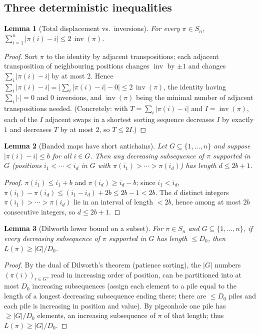 \documentclass[12pt]{article}
\newtheorem{lemma}{Lemma}
\theoremstyle{definition}
\DeclareMathOperator{\inv}{inv}
\begin{document}
\subsection{Three deterministic inequalities}
\begin{lemma}[Total displacement vs.\ inversions]\label{lem:tdisp}
For every $\pi\in S_n$, $\displaystyle\sum_{i=1}^n|\pi(i)-i|\le 2\,\inv(\pi)$.
\end{lemma}
\begin{proof}
Sort $\pi$ to the identity by adjacent transpositions; each adjacent transposition of
neighbouring positions changes $\inv$ by $\pm1$ and changes $\sum_i|\pi(i)-i|$ by at
most $2$. Hence $\sum_i|\pi(i)-i|=\big|\sum_i|\pi(i)-i|-0\big|\le 2\,\inv(\pi)$, the
identity having $\sum_i|\cdot|=0$ and $0$ inversions, and $\inv(\pi)$ being the minimal
number of adjacent transpositions needed. (Concretely: with $T=\sum_i|\pi(i)-i|$ and
$I=\inv(\pi)$, each of the $I$ adjacent swaps in a shortest sorting sequence decreases
$I$ by exactly $1$ and decreases $T$ by at most $2$, so $T\le 2I$.)
\end{proof}

\begin{lemma}[Banded maps have short antichains]\label{lem:band}
Let $G\subseteq\{1,\dots,n\}$ and suppose $|\pi(i)-i|\le b$ for all $i\in G$. Then any
decreasing subsequence of $\pi$ supported in $G$ (positions $i_1<\cdots<i_d$ in $G$ with
$\pi(i_1)>\cdots>\pi(i_d)$) has length $d\le 2b+1$.
\end{lemma}
\begin{proof}
$\pi(i_1)\le i_1+b$ and $\pi(i_d)\ge i_d-b$; since $i_1<i_d$,
$\pi(i_1)-\pi(i_d)\le (i_1-i_d)+2b\le 2b-1<2b$. The $d$ distinct integers
$\pi(i_1)>\cdots>\pi(i_d)$ lie in an interval of length $<2b$, hence among at most $2b$
consecutive integers, so $d\le 2b+1$.
\end{proof}

\begin{lemma}[Dilworth lower bound on a subset]\label{lem:dilworth}
For $\pi\in S_n$ and $G\subseteq\{1,\dots,n\}$, if every decreasing subsequence of $\pi$
supported in $G$ has length $\le D_0$, then $L(\pi)\ge |G|/D_0$.
\end{lemma}
\begin{proof}
By the dual of Dilworth's theorem (patience sorting), the $|G|$ numbers
$(\pi(i))_{i\in G}$, read in increasing order of position, can be partitioned into at
most $D_0$ increasing subsequences (assign each element to a pile equal to the length of
a longest decreasing subsequence ending there; there are $\le D_0$ piles and each pile
is increasing in position and value). By pigeonhole one pile has $\ge |G|/D_0$ elements,
an increasing subsequence of $\pi$ of that length; thus $L(\pi)\ge |G|/D_0$.
\end{proof}
\end{document}
